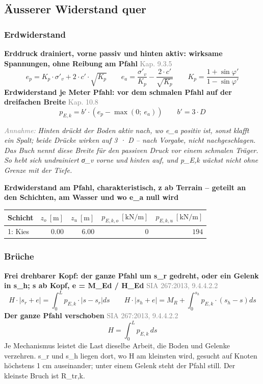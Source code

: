 \documentclass[11pt,a4paper]{article}
\newcommand{\normref}[1]{{\small\textcolor{gray}{#1}}}
\newcommand{\hinweis}[2]{\par\noindent\textcolor{gray}{\textit{#1:}} \textit{#2}\par}
\begin{document}
\subsection{Äusserer Widerstand quer}
\subsubsection{Erdwiderstand}
\noindent\textbf{Erddruck drainiert, vorne passiv und hinten aktiv: wirksame Spannungen, ohne Reibung am Pfahl} \hfill \normref{Kap. 9.3.5}
\begin{equation*}
e_p = K_p \cdot \sigma'_v + 2 \cdot c' \cdot \sqrt{K_p} \qquad e_a = \frac{\sigma'_v}{K_p} - \frac{2 \cdot c'}{\sqrt{K_p}} \qquad K_p = \frac{1 + \sin\varphi'}{1 - \sin\varphi'}
\end{equation*}
\noindent\textbf{Erdwiderstand je Meter Pfahl: vor dem schmalen Pfahl auf der dreifachen Breite} \hfill \normref{Kap. 10.8}
\begin{equation*}
p_{E,k} = b' \cdot \left(e_p - \max\left(0;\ e_a\right)\right) \qquad b' = 3 \cdot D
\end{equation*}
\hinweis{Annahme}{Hinten drückt der Boden aktiv nach, wo e\_a positiv ist, sonst klafft ein Spalt; beide Drücke wirken auf 3 · D -- nach Vorgabe, nicht nachgeschlagen. Das Buch nennt diese Breite für den passiven Druck vor einem schmalen Träger. So hebt sich undrainiert σ\_v vorne und hinten auf, und p\_E,k wächst nicht ohne Grenze mit der Tiefe.}
\noindent\textbf{Erdwiderstand am Pfahl, charakteristisch, z ab Terrain -- geteilt an den Schichten, am Wasser und wo e\_a null wird}
\begin{longtable}{lrrrr}
\hline
Schicht & $z_o\ [\mathrm{m}]$ & $z_u\ [\mathrm{m}]$ & $p_{E,k,o}\ [\mathrm{kN/m}]$ & $p_{E,k,u}\ [\mathrm{kN/m}]$ \\
\hline
\endhead
1: Kies & $0.00$ & $6.00$ & $0$ & $194$ \\
\hline
\end{longtable}
\subsubsection{Brüche}
\noindent\textbf{Frei drehbarer Kopf: der ganze Pfahl um s\_r gedreht, oder ein Gelenk in s\_h; s ab Kopf, e = M\_Ed / H\_Ed} \hfill \normref{SIA 267:2013, 9.4.4.2.2}
\begin{equation*}
H \cdot \left|s_r + e\right| = \int_0^L p_{E,k} \cdot \left|s - s_r\right| ds \qquad H \cdot \left|s_h + e\right| = M_R + \int_0^{s_h} p_{E,k} \cdot \left(s_h - s\right) ds
\end{equation*}
\noindent\textbf{Der ganze Pfahl verschoben} \hfill \normref{SIA 267:2013, 9.4.4.2.2}
\begin{equation*}
H = \int_0^L p_{E,k}\, ds
\end{equation*}
Je Mechanismus leistet die Last dieselbe Arbeit, die Boden und Gelenke verzehren. s\_r und s\_h liegen dort, wo H am kleinsten wird, gesucht auf Knoten höchstens 1 cm auseinander; unter einem Gelenk steht der Pfahl still. Der kleinste Bruch ist R\_tr,k.
\end{document}
